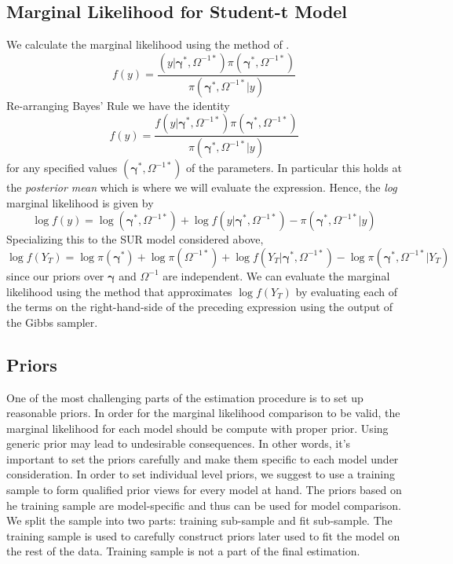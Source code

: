 \subsection{Marginal Likelihood for Student-t Model}
 We calculate the marginal likelihood using the method of \cite{chib1995marginal}.
 \begin{equation*}
 f(y) = \frac{(y|\boldsymbol{\gamma}^*,\Omega^{-1*})\pi\left(\boldsymbol{\gamma}^*, \Omega^{-1*}\right)}{\pi\left(\boldsymbol{\gamma}^*, \Omega^{-1*}|y \right)}
 \end{equation*} 
Re-arranging Bayes' Rule we have the identity
\begin{equation*}
f(y) = \frac{f(y|\boldsymbol{\gamma}^*,\Omega^{-1*})\pi\left(\boldsymbol{\gamma}^*, \Omega^{-1*}\right)}{\pi\left(\boldsymbol{\gamma}^*, \Omega^{-1*}|y \right)}
\end{equation*}
for any specified values $(\boldsymbol{\gamma}^*,\Omega^{-1*})$ of the parameters.
In particular this holds at the \emph{posterior mean} which is where we will evaluate the expression.
Hence, the \emph{log} marginal likelihood is given by
\begin{equation*}
\log{f(y)} =  \log \left(\boldsymbol{\gamma}^*, \Omega^{-1*}\right) + \log{f(y|\boldsymbol{\gamma}^*,\Omega^{-1*})} - \pi\left(\boldsymbol{\gamma}^*, \Omega^{-1*}|y \right)
\end{equation*}
Specializing this to the SUR model considered above,
\begin{equation*}
\log f(Y_T) = \log \pi(\boldsymbol{\gamma}^*) + \log \pi\left( \Omega^{-1*} \right) + \log f\left( Y_T|\boldsymbol{\gamma}^*, \Omega^{-1*} \right) - \log \pi\left( \boldsymbol{\gamma}^*, \Omega^{-1*}|Y_T \right)
\end{equation*}
since our priors over $\boldsymbol{\gamma}$ and $\Omega^{-1}$ are independent. We can evaluate the marginal likelihood using the \cite{chib1995marginal} method that approximates $\log f(Y_T)$ by evaluating each of the terms on the right-hand-side of the preceding expression using the output of the Gibbs sampler.

\subsection{Priors}
One of the most challenging parts of the estimation procedure is to set up reasonable priors. 
In order for the marginal likelihood comparison to be valid, the marginal likelihood for each model should be compute with proper prior. 
Using generic prior may lead to undesirable consequences. 
In other words, it's important to set the priors carefully and make them specific to each model under consideration. 
In order to set individual level priors, we suggest to use a training sample to form qualified prior views for every model at hand.
The priors based on he training sample are model-specific and thus can be used for model comparison. 
We split  the sample into two parts: training sub-sample and fit sub-sample. 
The training sample is used to carefully construct priors later used to fit the model on the rest of the data. 
Training sample is not a part of the final estimation. 


